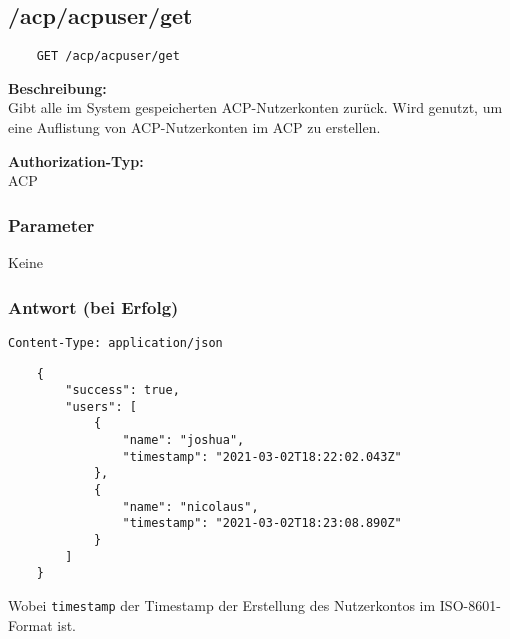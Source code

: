 \subsection{/acp/acpuser/get}

\begin{lstlisting}
    GET /acp/acpuser/get
\end{lstlisting}

\textbf{Beschreibung:} \\
Gibt alle im System gespeicherten ACP-Nutzerkonten zurück. Wird genutzt, um eine Auflistung von ACP-Nutzerkonten im ACP zu erstellen.

\textbf{Authorization-Typ:} \\
ACP

\subsubsection{Parameter}
Keine

\subsubsection{Antwort (bei Erfolg)}

\lstinline{Content-Type: application/json}
\begin{lstlisting}
    {
        "success": true, 
        "users": [
            {
                "name": "joshua",
                "timestamp": "2021-03-02T18:22:02.043Z"
            },
            {
                "name": "nicolaus",
                "timestamp": "2021-03-02T18:23:08.890Z"
            }
        ]
    }
\end{lstlisting}

Wobei \lstinline{timestamp} der Timestamp der Erstellung des Nutzerkontos im ISO-8601-Format ist.